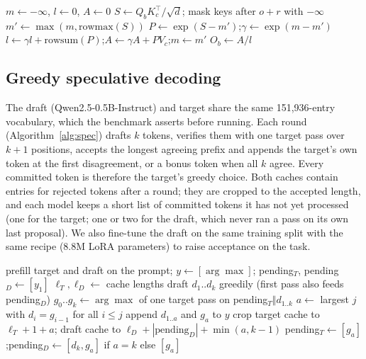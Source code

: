 \documentclass[conference]{IEEEtran}
\begin{document}
\begin{algorithm}[t]
\caption{Tiled causal attention with online softmax (one head)}
\label{alg:tiled}
\begin{algorithmic}[1]
  \State $m \gets -\infty$, $l \gets 0$, $A \gets 0$
    \State $S \gets Q_bK_c^\top/\sqrt{d}$; mask keys after $o+r$ with $-\infty$
    \State $m' \gets \max(m, \text{rowmax}(S))$
    \State $P \gets \exp(S - m')$;\quad $\gamma \gets \exp(m - m')$
    \State $l \gets \gamma l + \text{rowsum}(P)$;\quad $A \gets \gamma A + PV_c$;\quad $m \gets m'$
  \EndFor
  \State $O_b \gets A / l$
\EndFor
\end{algorithmic}
\end{algorithm}

\subsection{Greedy speculative decoding}
The draft (Qwen2.5-0.5B-Instruct) and target share the same 151{,}936-entry vocabulary, which the benchmark asserts before running. Each round (Algorithm~\ref{alg:spec}) drafts $k$ tokens, verifies them with one target pass over $k{+}1$ positions, accepts the longest agreeing prefix and appends the target's own token at the first disagreement, or a bonus token when all $k$ agree. Every committed token is therefore the target's greedy choice. Both caches contain entries for rejected tokens after a round; they are cropped to the accepted length, and each model keeps a short list of committed tokens it has not yet processed (one for the target; one or two for the draft, which never ran a pass on its own last proposal). We also fine-tune the draft on the same training split with the same recipe (8.8M LoRA parameters) to raise acceptance on the task.

\begin{algorithm}[t]
\caption{Greedy speculative decoding with cache synchronisation}
\label{alg:spec}
\begin{algorithmic}[1]
\State prefill target and draft on the prompt; $y \gets [\arg\max]$; pending$_T$, pending$_D \gets [y_1]$
  \State $\ell_T, \ell_D \gets$ cache lengths
  \State draft $d_1..d_k$ greedily (first pass also feeds pending$_D$)
  \State $g_0..g_k \gets \arg\max$ of one target pass on pending$_T\Vert d_{1..k}$
  \State $a \gets$ largest $j$ with $d_i = g_{i-1}$ for all $i\le j$
  \State append $d_{1..a}$ and $g_a$ to $y$
  \State crop target cache to $\ell_T + 1 + a$; draft cache to $\ell_D + |\text{pending}_D| + \min(a, k{-}1)$
  \State pending$_T \gets [g_a]$;\quad pending$_D \gets [d_k, g_a]$ if $a{=}k$ else $[g_a]$
\EndWhile
\end{algorithmic}
\end{algorithm}
\end{document}
